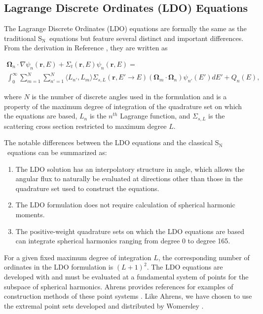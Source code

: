 \documentclass{article} %
\newcommand{\bo}{\mathbf\Omega}
\newcommand{\vecr}{\textbf{r}}
\newcommand{\sn}{S$_\mathrm{N}$}
\begin{document}
\subsection{Lagrange Discrete Ordinates (LDO) Equations}

The Lagrange Discrete Ordinates (LDO) equations are formally the same as the
traditional \sn\ equations but feature several distinct and important
differences. From the derivation in Reference \cite{ahrens}, they are written
as

\begin{multline}
\bo_n\cdot\nabla\psi_{n}(\vecr,E) + 
\Sigma_{t}(\vecr,E)\psi_{n}(\vecr,E) = \\
\int_0^\infty\sum_{m=1}^{N}\sum_{n'=1}^{N}\langle L_{n'},L_{m}\rangle
\Sigma_{s,L}(\vecr,E'\rightarrow E)(\bo_{m}\cdot\bo_n)\psi_{n'}(E')dE'
+ Q_{n}(E),
\end{multline}

\noindent where $N$ is the number of discrete angles used in the formulation
and is a property of the maximum degree of integration of the quadrature set
on which the equations are based, $L_n$ is the $n^{th}$ Lagrange function, and
$\Sigma_{s,L}$ is the scattering cross section restricted to maximum degree
$L$.

The notable differences between the LDO equations and the classical \sn\
equations can be summarized as:

\begin{enumerate}
\item{The LDO solution has an interpolatory structure in angle, which allows
      the angular flux to naturally be evaluated at directions other than those
      in the quadrature set used to construct the equations.}
\item{The LDO formulation does not require calculation of spherical harmonic
      moments.}
\item{The positive-weight quadrature sets on which the LDO equations are based
      can integrate spherical harmonics ranging from degree 0 to degree 165.}
\end{enumerate}

For a given fixed maximum degree of integration $L$, the corresponding number
of ordinates in the LDO formulation is $(L+1)^2$. The LDO equations are
developed with and must be evaluated at a fundamental system of points for the
subspace of spherical harmonics. Ahrens provides references for examples of
construction methods of these point systems \cite{ahrens}. Like Ahrens, we
have chosen to use the extremal point sets developed and distributed by
Womersley \cite{wom}.
\end{document}
